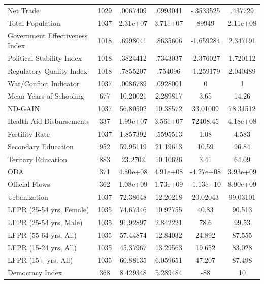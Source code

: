 \begin{table}[htbp]
\begin{tabular}{l*{1}{ccccc}}
Net Trade           &        1029&    .0067409&    .0993041&   -.3533525&     .437729\\
Total Population    &        1037&    2.31e+07&    3.71e+07&       89949&    2.11e+08\\
Government Effectiveness Index&        1018&    .6998041&    .8635606&   -1.659284&    2.347191\\
Political Stability Index&        1018&    .3824412&    .7343037&   -2.376027&    1.720112\\
Regulatory Quality Index&        1018&    .7855207&     .754096&   -1.259179&    2.040489\\
War/Conflict Indicator&        1037&    .0086789&    .0928001&           0&           1\\
Mean Years of Schooling&         677&    10.20021&    2.289817&        3.65&       14.26\\
ND-GAIN             &        1037&    56.80502&    10.38572&    33.01009&    78.31512\\
Health Aid Disbursements&         337&    1.99e+07&    3.56e+07&    72408.45&    4.18e+08\\
Fertility Rate      &        1037&    1.857392&    .5595513&        1.08&       4.583\\
Secondary Education &         952&    59.95119&    21.19613&       10.59&       96.84\\
Teritary Education  &         883&     23.2702&    10.10626&        3.41&       64.09\\
ODA                 &         371&    4.80e+08&    4.91e+08&   -4.27e+08&    3.93e+09\\
Official Flows      &         362&    1.08e+09&    1.73e+09&   -1.13e+10&    8.90e+09\\
Urbanization        &        1037&    72.38648&    12.20218&    20.02043&    99.03101\\
LFPR (25-54 yrs, Female) &        1035&    74.67346&    10.92755&       40.83&      90.513\\
LFPR (25-54 yrs, Male) &        1035&    91.92897&    2.842221&        78.6&       99.53\\
LFPR (55-64 yrs, All) &        1035&    57.44874&    12.84032&      24.892&      87.555\\
LFPR (15-24 yrs, All)&        1035&    45.37967&    13.29563&      19.652&      83.028\\
LFPR (15+ yrs, All) &        1035&    60.88135&    6.059651&      47.207&      87.498\\
Democracy Index     &         368&    8.429348&    5.289484&         -88&          10\\

\end{tabular}
\end{table}
